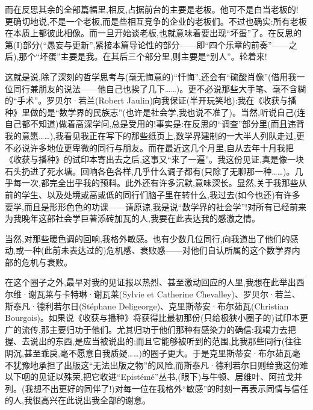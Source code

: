  而在反思其余的全部篇幅里,相反,占据前台的主要是老板。他可不是白当老板的! %
更确切地说,不是一个老板,而是些相互竞争的企业的老板们。不过也确实:所有老板在本质上都彼此相像。而一旦开始谈老板,也就意味着要出现“坏蛋”了。在反思的第(I)部分(“愚妄与更新”,紧接本篇导论性的部分——即“四个乐章的前奏”——之后),那个“坏蛋”主要是我。在其后三个部分里,则主要是“别人”。轮着来!

这就是说,除了深刻的哲学思考与(毫无悔意的)“忏悔”,还会有“硫酸肖像”(借用我一位同行兼朋友的说法——他自己也挨了几下……)。更不必说那些大手笔、毫不含糊的“手术”。罗贝尔·若兰(Robert Jaulin)向我保证(半开玩笑地):我在《收获与播种》里做的是“数学界的民族志”(也许是社会学,我也说不准了)。当然,听说自己(连自己都不知道)做着高深学问,总是受用的!事实是:在反思的“调查”部分里(而且违背我的意愿……),我看见我正在写下的那些纸页上,数学界建制的一大半人列队走过,更不必说许多地位更卑微的同行与朋友。而在最近这几个月里,自从去年十月我把《收获与播种》的试印本寄出去之后,这事又“来了一遍”。我这份见证,真是像一块石头扔进了死水塘。回响各色各样,几乎什么调子都有(只除了无聊那一种……)。几乎每一次,都完全出乎我的预料。此外还有许多沉默,意味深长。显然,关于我那些从前的学生、以及处境或高或低的同行们脑子里在转什么,我过去(如今也还)有许多要学,而且是形形色色的功课——请原谅,我是说“数学界的社会学”!对所有已经前来为我晚年这部社会学巨著添砖加瓦的人,我要在此表达我的感激之情。

当然,对那些暖色调的回响,我格外敏感。也有少数几位同行,向我道出了他们的感动,或一种(此前未表达过的)危机感、衰败感——对他们自认所属的这个数学界内部的危机与衰败。

 在这个圈子之外,最早对我的见证报以热烈、甚至激动回应的人里,我想在此举出西尔维·谢瓦莱与卡特琳·谢瓦莱(Sylvie et Catherine Chevalley)、罗贝尔·若兰、斯泰凡·德利若尔日(Stéphane Deligeorge)、克里斯蒂安·布尔茹瓦(Christian Bourgois)。如果说《收获与播种》将获得比最初那份(只给极狭小圈子的)试印本更广的流传,那主要归功于他们。尤其归功于他们那种有感染力的确信:我竭力去把握、去说出的东西,是应当被说出的;而且它能够被听到的范围,比我那些同行(往往阴沉,甚至乖戾,毫不愿意自我质疑……)的圈子更大。于是克里斯蒂安·布尔茹瓦毫不犹豫地承担了出版这“无法出版之物”的风险,而斯泰凡·德利若尔日则给我这份难以下咽的见证以殊荣,把它收进“Epistémé”丛书,(眼下)与牛顿、居维叶、阿拉戈并列。(我想不出更好的同伴了!)对每一位在我格外“敏感”的时刻一再表示同情与信任的人,我很高兴在此说出我全部的谢意。

